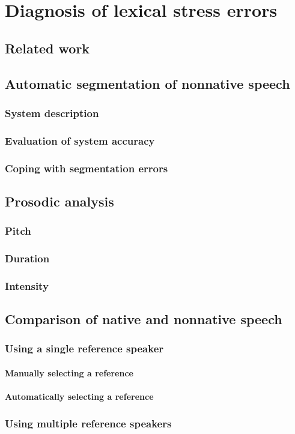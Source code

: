 %
%
\chapter{Diagnosis of lexical stress errors}
\label{chap:diagnosis}


\blindtext 

\section{Related work}

\section{Automatic segmentation of nonnative speech}
	\subsection{System description}
	\subsection{Evaluation of system accuracy}
	\subsection{Coping with segmentation errors}
	
\section{Prosodic analysis}
	\subsection{Pitch}
	\subsection{Duration}
	\subsection{Intensity}
	
\section{Comparison of native and nonnative speech}
	\subsection{Using a single reference speaker}
		\subsubsection{Manually selecting a reference}
		\subsubsection{Automatically selecting a reference}
	\subsection{Using multiple reference speakers}
		